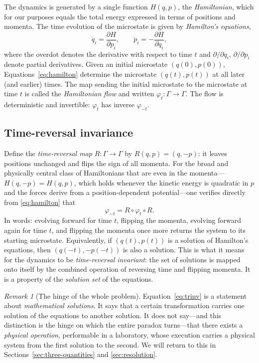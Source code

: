 \documentclass[11pt,a4paper]{article}
\theoremstyle{thmstyle}
\theoremstyle{definition}
\theoremstyle{remark}
\newtheorem{remark}[theorem]{Remark}
\begin{document}
The dynamics is generated by a single function $H(q,p)$, the
\emph{Hamiltonian}, which for our purposes equals the total energy
expressed in terms of positions and momenta. The time evolution of the
microstate is given by \emph{Hamilton's equations},
\begin{equation}
\dot{q}_{i} = \frac{\partial H}{\partial p_{i}}, \qquad
\dot{p}_{i} = -\frac{\partial H}{\partial q_{i}},
\label{eq:hamilton}
\end{equation}
where the overdot denotes the derivative with respect to time $t$ and
$\partial/\partial q_{i}$, $\partial/\partial p_{i}$ denote partial
derivatives. Given an initial microstate $(q(0),p(0))$,
Equations~\eqref{eq:hamilton} determine the microstate $(q(t),p(t))$ at
all later (and earlier) times. The map sending the initial microstate to
the microstate at time $t$ is called the \emph{Hamiltonian flow} and
written $\varphi_{t}:\Gamma\to\Gamma$. The flow is deterministic and
invertible: $\varphi_{t}$ has inverse $\varphi_{-t}$.

\subsection{Time-reversal invariance}
\label{sec:time-reversal}

Define the \emph{time-reversal map} $R:\Gamma\to\Gamma$ by
$R(q,p)=(q,-p)$: it leaves positions unchanged and flips the sign of all
momenta. For the broad and physically central class of Hamiltonians that
are even in the momenta---$H(q,-p)=H(q,p)$, which holds whenever the
kinetic energy is quadratic in $p$ and the forces derive from a
position-dependent potential---one verifies directly from
\eqref{eq:hamilton} that
\begin{equation}
\varphi_{-t} = R \circ \varphi_{t} \circ R .
\label{eq:trinv}
\end{equation}
In words: evolving forward for time $t$, flipping the momenta, evolving
forward again for time $t$, and flipping the momenta once more returns
the system to its starting microstate. Equivalently, if $(q(t),p(t))$ is
a solution of Hamilton's equations, then $(q(-t),-p(-t))$ is also a
solution. This is what it means for the dynamics to be
\emph{time-reversal invariant}: the set of solutions is mapped onto
itself by the combined operation of reversing time and flipping momenta.
It is a property of the \emph{solution set} of the equations.

\begin{remark}[The hinge of the whole problem]
\label{rem:hinge}
Equation~\eqref{eq:trinv} is a statement about \emph{mathematical
solutions}. It says that a certain transformation carries one solution
of the equations to another solution. It does not say---and this
distinction is the hinge on which the entire paradox turns---that there
exists a \emph{physical operation}, performable in a laboratory, whose
execution carries a physical system from the first solution to the
second. We will return to this in
Sections~\ref{sec:three-quantities} and \ref{sec:resolution}.
\end{remark}
\end{document}
